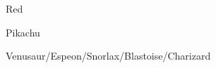 \begin{paracol}{2}
\begin{boss}{Red}
	\varwb
	\begin{fightSection}{Pikachu}
		\item {}
		\item \guardSpec
		\item \xAttack{} 
		\begin{notes}
			\item {}
		\end{notes}
		\item \xSpeed
		\item {} \return
	\end{fightSection}
	\begin{fightSection}{Venusaur/Espeon/Snorlax/Blastoise/Charizard}
		\item {} \return
	\end{fightSection}
	\varwe
\end{boss}

\end{paracol}
\vspace{3.5mm} 